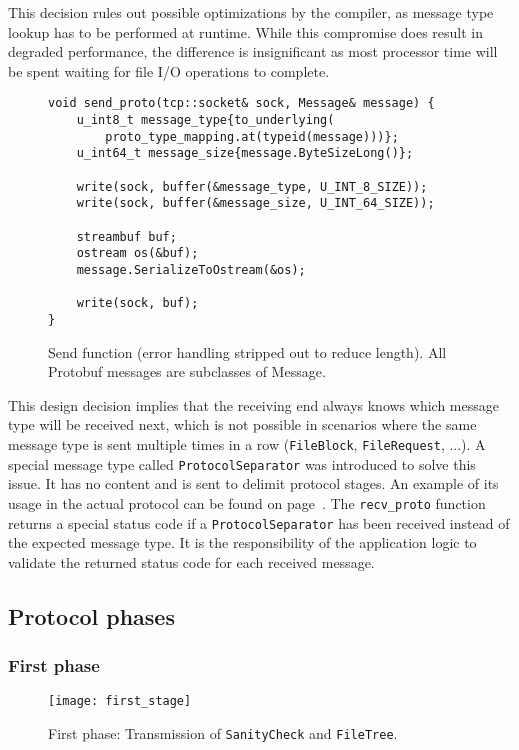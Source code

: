 \documentclass[a4paper]{article}
\begin{document}
This decision rules out possible optimizations by the compiler, as message type lookup has to be performed at runtime. While this compromise does result in degraded performance, the difference is insignificant as most processor time will be spent waiting for file I/O operations to complete.

\begin{figure}[H]
\begin{verbatim}
void send_proto(tcp::socket& sock, Message& message) {
	u_int8_t message_type{to_underlying(
		proto_type_mapping.at(typeid(message)))};
	u_int64_t message_size{message.ByteSizeLong()};

	write(sock, buffer(&message_type, U_INT_8_SIZE));
	write(sock, buffer(&message_size, U_INT_64_SIZE));

	streambuf buf;
	ostream os(&buf);
	message.SerializeToOstream(&os);

	write(sock, buf);
}
\end{verbatim}
\caption{Send function (error handling stripped out to reduce length). All Protobuf messages are subclasses of Message.}
\end{figure}

This design decision implies that the receiving end always knows which message type will be received next, which is not possible in scenarios where the same message type is sent multiple times in a row (\texttt{FileBlock}, \texttt{FileRequest}, ...). A special message type called \texttt{ProtocolSeparator} was introduced to solve this issue. It has no content and is sent to delimit protocol stages.
\bigbreak
An example of its usage in the actual protocol can be found on page~\pageref{fig:stage2}.
\bigbreak
The \texttt{recv\_proto} function returns a special status code if a \texttt{ProtocolSeparator} has been received instead of the expected message type. It is the responsibility of the application logic to validate the returned status code for each received message.

\subsection{Protocol phases}
\label{sec:phases}
\subsubsection{First phase}
\begin{figure}[H]
\centering
\texttt{[image: first\_stage]}
\caption{First phase: Transmission of \texttt{SanityCheck} and \texttt{FileTree}.}
\end{figure}
\end{document}
